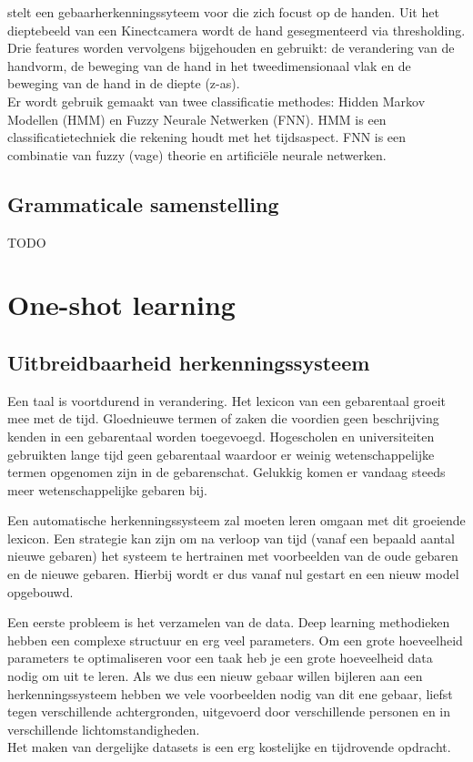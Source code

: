 \npar \cite{gesture-FNN-HMM} stelt een gebaarherkenningssyteem voor die zich focust op de handen. Uit het dieptebeeld van een Kinectcamera wordt de hand gesegmenteerd via thresholding. Drie features worden vervolgens bijgehouden en gebruikt: de verandering van de handvorm, de beweging van de hand in het tweedimensionaal vlak en de beweging van de hand in de diepte (z-as).
\\Er wordt gebruik gemaakt van twee classificatie methodes: Hidden Markov Modellen (HMM) en Fuzzy Neurale Netwerken (FNN). HMM is een classificatietechniek die rekening houdt met het tijdsaspect. FNN is een combinatie van fuzzy (vage) theorie en artifici\"ele neurale netwerken.

\subsection{Grammaticale samenstelling}
TODO
%

\section{One-shot learning}

\subsection{Uitbreidbaarheid herkenningssysteem}
Een taal is voortdurend in verandering.
Het lexicon van een gebarentaal groeit mee met de tijd. Gloednieuwe termen of zaken die voordien geen beschrijving kenden in een gebarentaal worden toegevoegd. Hogescholen en universiteiten gebruikten lange tijd geen gebarentaal waardoor er weinig wetenschappelijke termen opgenomen zijn in de gebarenschat. Gelukkig komen er vandaag steeds meer wetenschappelijke gebaren bij.

\npar Een automatische herkenningssysteem zal moeten leren omgaan met dit groeiende lexicon. Een strategie kan zijn om na verloop van tijd (vanaf een bepaald aantal nieuwe gebaren) het systeem te hertrainen met voorbeelden van de oude gebaren en de nieuwe gebaren. Hierbij wordt er dus vanaf nul gestart en een nieuw model opgebouwd.

\npar Een eerste probleem is het verzamelen van de data. Deep learning methodieken hebben een complexe structuur en erg veel parameters. Om een grote hoeveelheid parameters te optimaliseren voor een taak heb je een grote hoeveelheid data nodig om uit te leren. Als we dus een nieuw gebaar willen bijleren aan een herkenningssysteem hebben we vele voorbeelden nodig van dit ene gebaar, liefst tegen verschillende achtergronden, uitgevoerd door verschillende personen en in verschillende lichtomstandigheden.
\\ Het maken van dergelijke datasets is een erg kostelijke en tijdrovende opdracht.


